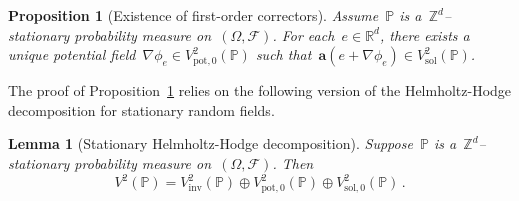 \documentclass[11pt,twoside]{article} %
\numberwithin{equation}{section}
\newtheorem{proposition}[theorem]{Proposition}
\newtheorem{lemma}[theorem]{Lemma}
\theoremstyle{definition}
\newcommand*{\Zd}{\ensuremath{\mathbb{Z}^d}}
\newcommand*{\Rd}{\ensuremath{\mathbb{R}^d}}
\newcommand{\pot}{\mathrm{pot}}
\newcommand{\sol}{\mathrm{sol}}
\newcommand{\inv}{\mathrm{inv}}
\renewcommand{\a}{\mathbf{a}}
\newcommand{\F}{\mathcal{F}}
\renewcommand{\P}{\mathbb{P}}
\begin{document}
\begin{proposition}[Existence of first-order correctors]
\label{p.qual.correctors}
Assume~$\P$ is a~$\Zd$--stationary probability measure on~$(\Omega,\F)$. For each~$e\in \Rd$, there exists a unique potential field~$\nabla \phi_e \in V^2_{\pot,0}(\P)$ such that~$\a(e+\nabla \phi_e)\in V^2_\sol(\P)$. 
\end{proposition}

The proof of Proposition~\ref{p.qual.correctors} relies on the following version of the Helmholtz-Hodge decomposition for stationary random fields. 

\begin{lemma}[Stationary Helmholtz-Hodge decomposition]
\label{l.stat.HH}
Suppose~$\P$ is a~$\Zd$--stationary probability measure on~$(\Omega,\F)$.
Then 
\begin{equation}
V^2(\P)
=
V^2_{\inv}(\P) \oplus
V^2_{\pot,0}(\P)
\oplus 
V^2_{\sol,0}(\P)
\,.
\end{equation}
\end{lemma}
\end{document}
